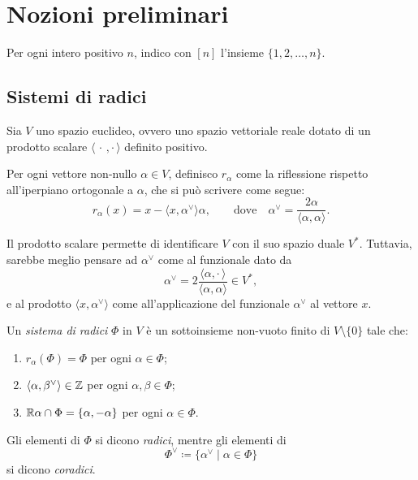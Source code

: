 
\chapter{Nozioni preliminari}
\label{ch:basics}

Per ogni intero positivo $n$, indico con $[n]$ l'insieme $\{1, 2, \dots, n\}$.

\section{Sistemi di radici}

Sia $V$ uno spazio euclideo, ovvero uno spazio vettoriale reale dotato di un
prodotto scalare $\langle \,\cdot \, , \cdot \,\rangle$ definito positivo.

Per ogni vettore non-nullo $\alpha \in V$, definisco $r_\alpha$
come la riflessione rispetto all'iperpiano ortogonale a $\alpha$,
che si pu\`o scrivere come segue:
\[
    r_\alpha(x) = x - \langle x, \alpha^\vee \rangle \alpha, 
    \qquad \text{dove} \quad \alpha^\vee = \frac{2\alpha}{\langle \alpha, \alpha\rangle}.
\]

\begin{remark}
    Il prodotto scalare permette di identificare $V$ con il suo spazio duale $V^*$.
    Tuttavia, sarebbe meglio pensare ad $\alpha^\vee$ come al funzionale dato da
    \[
        \alpha^\vee =
        2 \frac{\langle \alpha, \cdot \, \rangle}{\langle\alpha,\alpha\rangle}
        \in V^*,
    \]
    e al prodotto $\langle x, \alpha^\vee \rangle$ come all'applicazione del funzionale
    $\alpha^\vee$ al vettore $x$.
\end{remark}

\begin{definition}
    Un \emph{sistema di radici} $\Phi$ in $V$ \`e un sottoinsieme non-vuoto finito di 
    $V \setminus \{ 0 \}$ tale che:
    \begin{enumerate}
        \item $r_\alpha(\Phi) = \Phi$ per ogni $\alpha \in \Phi$;
        \item \label{item:sist_rad_2}
            $\langle \alpha, \beta^\vee \rangle \in \mathbb{Z}$ per ogni $\alpha, \beta \in \Phi$;
        \item $\mathbb{R} \alpha \cap \Phi = \{ \alpha, -\alpha \}$ per ogni $\alpha \in \Phi$.
    \end{enumerate}

    Gli elementi di $\Phi$ si dicono \emph{radici}, 
    mentre gli elementi di 
    \[
        \Phi^\vee \coloneq \{ \alpha^\vee \mid \alpha \in \Phi \}
    \]
    si dicono \emph{coradici}.
\end{definition}

